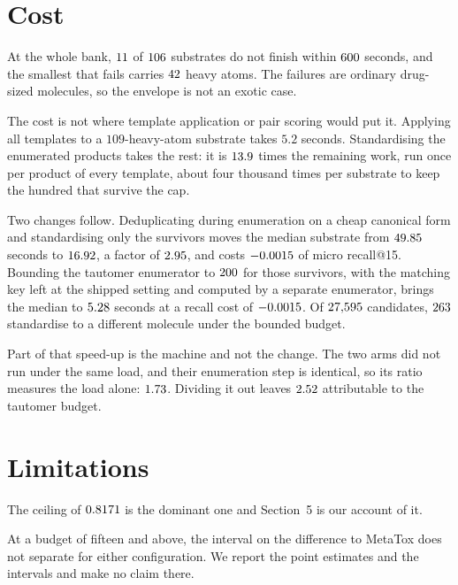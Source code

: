 \documentclass[11pt]{article}
\begin{document}
\section{Cost}

At the whole bank, $11$ of $106$ substrates do not finish within
$600$ seconds, and the smallest that fails carries $42$
heavy atoms. The failures are ordinary drug-sized molecules, so the envelope is not an exotic case.

The cost is not where template application or pair scoring would put it. Applying all templates to
a $109$-heavy-atom substrate takes $5.2$ seconds. Standardising the enumerated products takes the
rest: it is $13.9$ times the remaining work, run once per product of every
template, about four thousand times per substrate to keep the hundred that survive the cap.

Two changes follow. Deduplicating during enumeration on a cheap canonical form and standardising
only the survivors moves the median substrate from $49.85$ seconds to
$16.92$, a factor of $2.95$, and costs
$-0.0015$ of micro recall@15. Bounding the tautomer enumerator to
$200$ for those survivors, with the matching key left at the shipped setting and
computed by a separate enumerator, brings the median to $5.28$ seconds at a recall
cost of $-0.0015$. Of $27{,}595$ candidates, $263$
standardise to a different molecule under the bounded budget.

Part of that speed-up is the machine and not the change. The two arms did not run under the same
load, and their enumeration step is identical, so its ratio measures the load alone:
$1.73$. Dividing it out leaves $2.52$ attributable to the tautomer
budget.

\section{Limitations}

The ceiling of $0.8171$ is the dominant one and Section~5 is our account of it.

At a budget of fifteen and above, the interval on the difference to MetaTox does not separate for
either configuration. We report the point estimates and the intervals and make no claim there.
\end{document}
